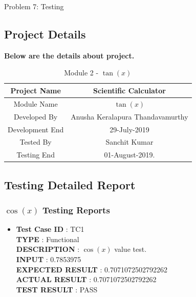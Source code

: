 \documentclass[a4paper,12pt]{article}
\begin{document}
\newpage
\begin{section}{Problem 7: Testing}

\subsection{Project Details}
\textbf{Below are the details about project.}
\renewcommand{\arraystretch}{1.5}
\begin{table}[htp]
	\centering
	\caption{Module 2 - $\tan(x)$} \vspace{0.5cm} \label{tab:definition_table} 
	\begin{tabular}{||c|c||}
		\hline \hline 
		\LARGE Project Name & \LARGE Scientific Calculator  \\ 
		\hline
		\LARGE Module Name & \LARGE $\tan(x)$  \\
		\hline
		\LARGE Developed By & \LARGE Anusha Keralapura Thandavamurthy \\
		\hline
		\LARGE Development End & \LARGE 29-July-2019 \\
		\hline  
		\LARGE Tested By & \LARGE Sanchit Kumar \\
		\hline 
		\LARGE Testing End & \LARGE 01-August-2019. \\
		\hline \hline
	\end{tabular}
\end{table}

\subsection{Testing Detailed Report}
\subsubsection{$\cos(x)$ Testing Reports}
\begin{itemize}
	
	\item \textbf{Test Case ID} \hspace{1.85cm} : TC1  \\
	\textbf{TYPE } \hspace{3.05cm}  : Functional\\
	\textbf{DESCRIPTION }\hspace{1.15cm} : $\cos(x)$ value test. \\
	\textbf{INPUT} \hspace{3.05cm} :  0.7853975 \\
	\textbf{EXPECTED RESULT} \hspace{0.01cm} : 0.7071072502792262 \\
	\textbf{ACTUAL RESULT} \hspace{0.6cm} : 0.7071072502792262 \\
	\textbf{TEST RESULT} \hspace{1.45cm} : PASS \\
	

\end{itemize}
\end{section}
\end{document}

